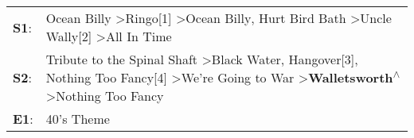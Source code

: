 \begin{supertabular}{p{0.03\textwidth}p{0.92\textwidth}}
 \textbf{S1}:  &                                                                                               Ocean Billy\textsuperscript{} \textgreater \enspace Ringo[1]\textsuperscript{} \textgreater \enspace Ocean Billy\textsuperscript{}, \enspace Hurt Bird Bath\textsuperscript{} \textgreater \enspace Uncle Wally[2]\textsuperscript{} \textgreater \enspace All In Time\textsuperscript{}  \enspace  \\
 \textbf{S2}:  &  Tribute to the Spinal Shaft\textsuperscript{} \textgreater \enspace Black Water\textsuperscript{}, \enspace Hangover[3]\textsuperscript{}, \enspace Nothing Too Fancy[4]\textsuperscript{} \textgreater \enspace We're Going to War\textsuperscript{} \textgreater \enspace \textbf{Walletsworth\textsuperscript{$\wedge$}} \textgreater \enspace Nothing Too Fancy\textsuperscript{}  \enspace  \\
 \textbf{E1}:  &                                                                                                                                                                                                                                                                                                                                                           40's Theme\textsuperscript{}  \enspace  \\
\end{supertabular}
